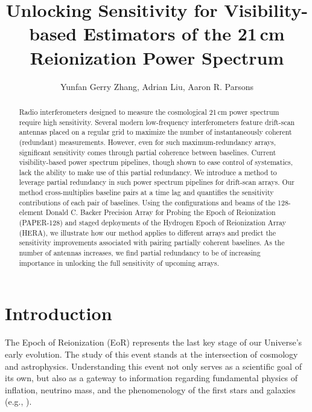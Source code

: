 \documentclass[twocolumn,apj,numberedappendix]{emulateapj}
\renewcommand\[{\begin{equation}}
\renewcommand\]{\end{equation}}
\begin{document}
\title{Unlocking Sensitivity for Visibility-based Estimators of the 21\,cm Reionization Power Spectrum}

\author{
Yunfan Gerry Zhang,
Adrian Liu,
Aaron R. Parsons
}

\begin{abstract}
Radio interferometers designed to measure the cosmological 21\,cm power spectrum require high sensitivity. Several modern low-frequency interferometers feature drift-scan antennas placed on a regular grid to maximize the number of instantaneously coherent (redundant) measurements. However, even for such maximum-redundancy arrays, significant sensitivity comes through partial coherence between baselines. Current visibility-based power spectrum pipelines, though shown to ease control of systematics, lack the ability to make use of this partial redundancy. We introduce a method to leverage partial redundancy in such power spectrum pipelines for drift-scan arrays. Our method cross-multiplies baseline pairs at a time lag and quantifies the sensitivity contributions of each pair of baselines. 
Using the configurations and beams of the 128-element Donald C. Backer Precision Array for Probing the Epoch of Reionization (PAPER-128) and staged deployments of the Hydrogen Epoch of Reionization Array (HERA), we illustrate how our method applies to different arrays and predict the sensitivity improvements associated with pairing partially coherent baselines. As the number of antennas increases, we find partial redundancy to be of increasing importance in unlocking the full sensitivity of upcoming arrays. 
\end{abstract}


\section{Introduction}

The Epoch of Reionization (EoR) represents the last key
stage of our Universe's early evolution. The study of this event stands at
the intersection of cosmology and astrophysics. Understanding this
event not only serves as a scientific goal
of its own, but also as a gateway to information
regarding fundamental physics of inflation, neutrino mass, and the phenomenology
of the first stars and galaxies (e.g., \citealt{LiuOpticalDepth, Liu2016b, Mao2008, DEw21cm, Bull2015, Oyama20131186}). 
\end{document}
